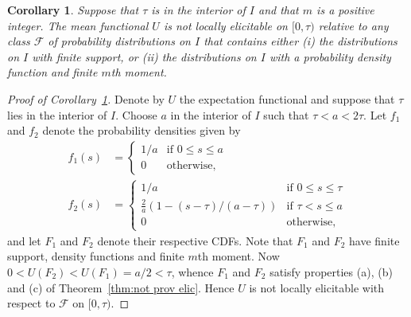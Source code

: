 \documentclass[10pt,a4paper]{amsart}
\newtheorem{cor}{Corollary}
\begin{document}
\begin{cor}\label{cor:expectation not provisionally elicitable}
Suppose that $\tau$ is in the interior of $I$ and that $m$ is a positive integer. The mean functional $U$ is not locally elicitable on $[0,\tau)$ relative to any class $\mathcal{F}$ of probability distributions on $I$ that contains either (i) the distributions on $I$ with finite support, or (ii) the distributions on $I$ with a probability density function and finite $m$th moment.
\end{cor}

\begin{proof}[Proof of Corollary~\ref{cor:expectation not provisionally elicitable}]
Denote by $U$ the expectation functional and suppose that $\tau$ lies in the interior of $I$.
Choose $a$ in the interior of $I$ such that $\tau<a<2\tau$. Let $f_1$ and $f_2$ denote the probability densities given by
\begin{align*}
f_1(s)&=
\begin{cases}
1/a & \text{if } 0\leq s \leq a \\
0 & \text{otherwise},
\end{cases} \\
f_2(s)&=
\begin{cases}
1/a & \text{if } 0\leq s \leq \tau \\
\frac{2}{a}(1 - (s-\tau)/(a-\tau)) & \text{if } \tau < s \leq a \\
0 & \text{otherwise,}
\end{cases}
\end{align*}
and let $F_1$ and $F_2$ denote their respective CDFs. Note that $F_1$ and $F_2$ have finite support, density functions and finite $m$th moment. Now $0 < U(F_2) < U(F_1)=a/2<\tau$, whence $F_1$ and $F_2$ satisfy properties (a), (b) and (c) of Theorem~\ref{thm:not prov elic}.  Hence $U$ is not locally elicitable with respect to $\mathcal{F}$ on $[0,\tau)$.
\end{proof}
\end{document}
